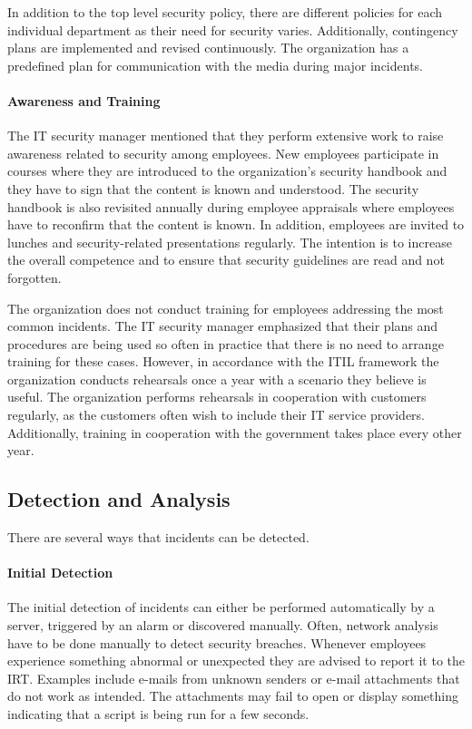 In addition to the top level security policy, there are different policies for each individual department as their need for security varies. Additionally, contingency plans are implemented and revised continuously. The organization has a predefined plan for communication with the media during major incidents. 

\paragraph{Awareness and Training}
The IT security manager mentioned that they perform extensive work to raise awareness related to security among employees. New employees participate in courses where they are introduced to the organization's security handbook and they have to sign that the content is known and understood. The security handbook is also revisited annually during employee appraisals where employees have to reconfirm that the content is known. In addition, employees are invited to lunches and security-related presentations regularly. The intention is to increase the overall competence and to ensure that security guidelines are read and not forgotten.

The organization does not conduct training for employees addressing the most common incidents. The IT security manager emphasized that their plans and procedures are being used so often in practice that there is no need to arrange training for these cases. However, in accordance with the ITIL framework the organization conducts rehearsals once a year with a scenario they believe is useful. The organization performs rehearsals in cooperation with customers regularly, as the customers often wish to include their IT service providers. Additionally, training in cooperation with the government takes place every other year. 

\subsection{Detection and Analysis}
There are several ways that incidents can be detected.
\paragraph{Initial Detection}
The initial detection of incidents can either be performed automatically by a server, triggered by an alarm or discovered manually. Often, network analysis have to be done manually to detect security breaches. Whenever employees experience something abnormal or unexpected they are advised to report it to the \ac{IRT}. Examples include e-mails from unknown senders or e-mail attachments that do not work as intended. The attachments may fail to open or display something indicating that a script is being run for a few seconds.

